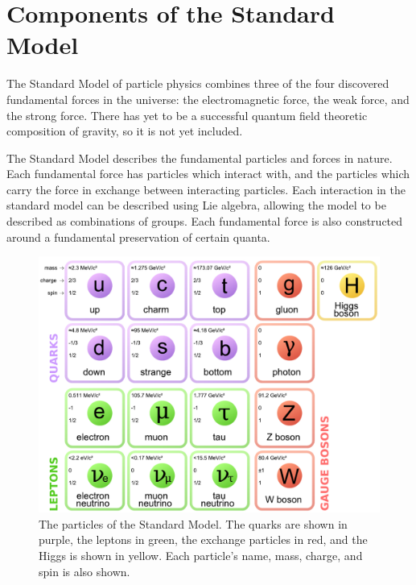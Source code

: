 \section{Components of the Standard Model}
The Standard Model of particle physics combines three of the four discovered fundamental forces in the universe: the electromagnetic force, the weak force, and the strong force.  There has yet to be a successful quantum field theoretic composition of gravity, so it is not yet included.

The Standard Model describes the fundamental particles and forces in nature.  Each fundamental force has particles which interact with, and the particles which carry the force in exchange between interacting particles.  Each interaction in the standard model can be described using Lie algebra, allowing the model to be described as combinations of groups.  Each fundamental force is also constructed around a fundamental preservation of certain quanta.

\begin{figure}[!htbp]
    \centering
    \includegraphics[width=\textwidth]{figures/standard_model.pdf}
    \caption[Diagram of the particles in the standard model.]
       {The particles of the Standard Model.  The quarks are shown in purple, the leptons in green, the exchange particles in red, and the Higgs is shown in yellow.  Each particle's name, mass, charge, and spin is also shown.}
    \label{fig:ParticleTable}
\end{figure}

